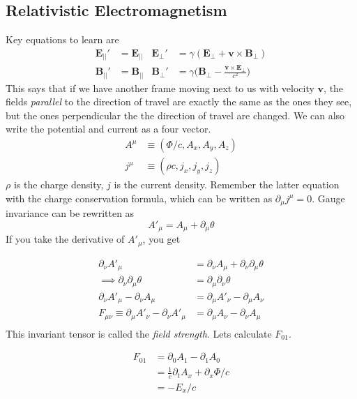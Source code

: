 \subsection{Relativistic Electromagnetism}
Key equations to learn are
\begin{align}
    \textbf{E}_{||}' &= \textbf{E}_{||} & \textbf{E}_\perp ' &= \gamma( \textbf{E}_\perp + \textbf{v}\times\textbf{B}_\perp)\\
    \textbf{B}_{||}' &=\textbf{B}_{||} & \textbf{B}_\perp' &= \gamma\Big(\textbf{B}_\perp -\frac{\textbf{v}\times\textbf{E}_\perp}{c^2}\Big)
\end{align}
This says that if we have another frame moving next to us with velocity $\textbf{v}$, the fields \emph{parallel} to the direction of travel are exactly the same as the ones they see, but the ones perpendicular the the direction of travel are changed. We can also write the potential and current as a four vector.
\begin{align}
A^\mu &\equiv (\Phi/c, A_x,A_y,A_z)\\
j^{\mu} &\equiv (\rho c, j_x, j_y, j_z)
\end{align}
$\rho$ is the charge density, $j$ is the current density. Remember the latter equation with the charge conservation formula, which can be written as $\partial_\mu j^\mu = 0$. Gauge invariance can be rewritten as 
$$A'_\mu = A_\mu + \partial_\mu \theta$$
If you take the derivative of $A'_\mu$, you get

\begin{align}
\partial_\nu A'_\mu &= \partial_\nu A_\mu + \partial_\nu \partial_\mu \theta\\
\implies \partial_\nu \partial_\mu \theta &= \partial_\mu \partial_\nu \theta\\
\partial_\nu A'_\mu - \partial_\nu A_\mu &= \partial_\mu A'_\nu - \partial_\mu A_\nu \\
F_{\mu\nu} \equiv\partial_\mu A'_\nu - \partial_\nu A'_\mu &= \partial_\mu A_\nu - \partial_\nu A_\mu \\
\end{align}
This invariant tensor is called the \textit{field strength}. Lets calculate $F_{01}$.

\begin{align}
F_{01} &= \partial_0 A_1 - \partial_1 A_0\\
 &= \frac{1}{c}\partial_t A_x + \partial_x \Phi/c\\
 &= -E_x/c
\end{align}

